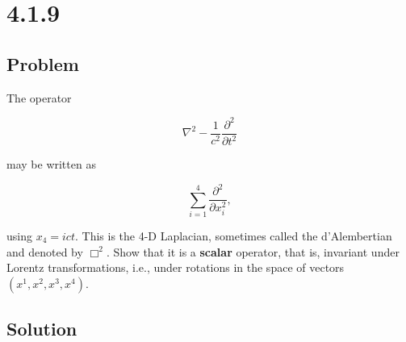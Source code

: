 \documentclass[12pt]{article}
\begin{document}
\section{4.1.9}

\subsection{Problem}

The operator

\[
    \nabla^2 - \frac{1}{c^2} \frac{\partial^2}{\partial t^2}
\]

may be written as

\[
    \sum^4_{i = 1} \frac{\partial^2}{\partial x^2_i},
\]

using \(x_4 = ict\). This is the 4-D Laplacian, sometimes called the d'Alember\-tian and denoted
by \(\Box^2\). Show that it is a \textbf{scalar} operator, that is, invariant under Lorentz
transformations, i.e., under rotations in the space of vectors \((x^1, x^2, x^3, x^4)\).

\subsection{Solution}



\nocite{arfken2013mathematical}
\nocite{El-Deeb_PEU-356_Assignments}
\end{document}
